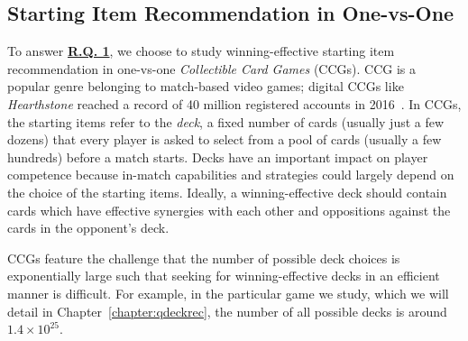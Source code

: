 \subsection{Starting Item Recommendation in One-vs-One}\label{sec:thesis_overview:item_recom}


To answer \hyperref[rq1]{\textbf{R.Q. 1}}, we choose to study winning-effective starting item recommendation in one-vs-one \textit{Collectible Card Games} (CCGs). CCG is a popular genre belonging to match-based video games; digital CCGs like \textit{Hearthstone} reached a record of 40 million registered accounts in 2016~\cite{hearthstonepopular}. In CCGs, the starting items refer to the \textit{deck}, a fixed number of cards (usually just a few dozens) that every player is asked to select from a pool of cards (usually a few hundreds) before a match starts. Decks have an important impact on player competence because in-match capabilities and strategies could largely depend on the choice of the starting items. Ideally, a winning-effective deck should contain cards which have effective synergies with each other and oppositions against the cards in the opponent's deck. 

CCGs feature the challenge that the number of possible deck choices is exponentially large such that seeking for winning-effective decks in an efficient manner is difficult. For example, in the particular game we study, which we will detail in Chapter~\ref{chapter:qdeckrec}, the number of all possible decks is around $1.4 \times 10^{25}$. 

